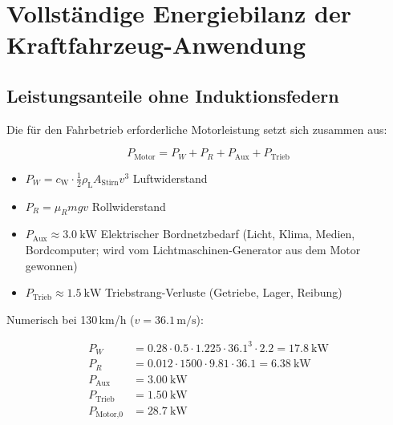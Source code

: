 ﻿\documentclass[12pt, a4paper]{report}
\theoremstyle{definition}
\theoremstyle{remark}
\newcommand{\rhoL}{\rho_{\text{L}}}
\newcommand{\cW}{c_{\text{W}}}
\newcommand{\Astirnfl}{A_{\text{Stirn}}}
\begin{document}
\chapter{Vollständige Energiebilanz der Kraftfahrzeug-Anwendung}
\label{chap:energiebilanz}

\section{Leistungsanteile ohne Induktionsfedern}

Die für den Fahrbetrieb erforderliche Motorleistung setzt sich zusammen aus:

\begin{equation}
  P_{\text{Motor}} = P_W + P_R + P_{\text{Aux}} + P_{\text{Trieb}}
  \label{eq:p_motor}
\end{equation}

\begin{itemize}
  \item $P_W = \cW \cdot \frac{1}{2}\rhoL \Astirnfl v^3$ \quad Luftwiderstand
  \item $P_R = \mu_R m g v$ \quad Rollwiderstand
  \item $P_{\text{Aux}} \approx \SI{3.0}{\kilo\watt}$ \quad Elektrischer Bordnetzbedarf
        (Licht, Klima, Medien, Bordcomputer; wird vom Lichtmaschinen-Generator
        aus dem Motor gewonnen)
  \item $P_{\text{Trieb}} \approx \SI{1.5}{\kilo\watt}$ \quad Triebstrang-Verluste
        (Getriebe, Lager, Reibung)
\end{itemize}

Numerisch bei 130\,km/h ($v = 36.1\,\text{m/s}$):

\begin{align}
  P_W     &= 0.28 \cdot 0.5 \cdot 1.225 \cdot 36.1^3 \cdot 2.2 = \SI{17.8}{\kilo\watt} \\
  P_R     &= 0.012 \cdot 1500 \cdot 9.81 \cdot 36.1  = \SI{6.38}{\kilo\watt} \\
  P_{\text{Aux}}   &= \SI{3.00}{\kilo\watt} \\
  P_{\text{Trieb}} &= \SI{1.50}{\kilo\watt} \\
  P_{\text{Motor,0}} &= \SI{28.7}{\kilo\watt}
  \label{eq:p_motor_130}
\end{align}
\end{document}
